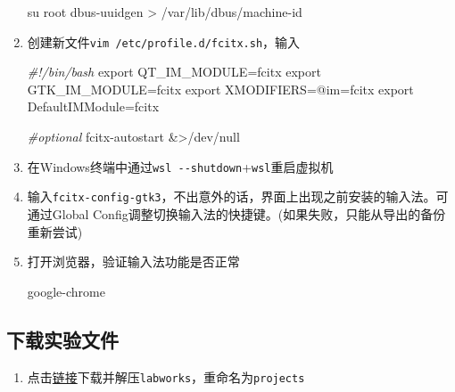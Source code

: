 \documentclass[
]{article}
\newenvironment{Shaded}{}{}
\newcommand{\BuiltInTok}[1]{\textcolor[rgb]{0.00,0.50,0.00}{#1}}
\newcommand{\CommentTok}[1]{\textcolor[rgb]{0.38,0.63,0.69}{\textit{#1}}}
\newcommand{\ExtensionTok}[1]{#1}
\newcommand{\FunctionTok}[1]{\textcolor[rgb]{0.02,0.16,0.49}{#1}}
\newcommand{\NormalTok}[1]{#1}
\newcommand{\OperatorTok}[1]{\textcolor[rgb]{0.40,0.40,0.40}{#1}}
\newcommand{\VariableTok}[1]{\textcolor[rgb]{0.10,0.09,0.49}{#1}}
\begin{document}
\begin{enumerate}
	      \begin{Shaded}
		      \begin{Highlighting}[]
			      \FunctionTok{su}\NormalTok{ root}
			      \ExtensionTok{dbus{-}uuidgen} \OperatorTok{\textgreater{}}\NormalTok{ /var/lib/dbus/machine{-}id}
		      \end{Highlighting}
	      \end{Shaded}
	\item
	      创建新文件\texttt{vim\ /etc/profile.d/fcitx.sh}，输入

	      \begin{Shaded}
		      \begin{Highlighting}[]
			      \CommentTok{\#!/bin/bash}
			      \BuiltInTok{export} \VariableTok{QT\_IM\_MODULE}\OperatorTok{=}\NormalTok{fcitx}
			      \BuiltInTok{export} \VariableTok{GTK\_IM\_MODULE}\OperatorTok{=}\NormalTok{fcitx}
			      \BuiltInTok{export} \VariableTok{XMODIFIERS}\OperatorTok{=}\NormalTok{@im=fcitx}
			      \BuiltInTok{export} \VariableTok{DefaultIMModule}\OperatorTok{=}\NormalTok{fcitx}

			      \CommentTok{\#optional}
			      \ExtensionTok{fcitx{-}autostart} \OperatorTok{\&\textgreater{}}\NormalTok{/dev/null}
		      \end{Highlighting}
	      \end{Shaded}
	\item
	      在Windows终端中通过\texttt{wsl\ -\/-shutdown}+\texttt{wsl}重启虚拟机
	\item
	      输入\texttt{fcitx-config-gtk3}，不出意外的话，界面上出现之前安装的输入法。可通过Global
	      Config调整切换输入法的快捷键。(如果失败，只能从导出的备份重新尝试)
	\item
	      打开浏览器，验证输入法功能是否正常

	      \begin{Shaded}
		      \begin{Highlighting}[]
			      \NormalTok{google{-}chrome}
		      \end{Highlighting}
	      \end{Shaded}
\end{enumerate}

\subsection{下载实验文件}\label{ux4e0bux8f7dux5b9eux9a8cux6587ux4ef6}

\begin{enumerate}
	\def\labelenumi{\arabic{enumi}.}
	\item
	      点击\href{https://seunic-my.sharepoint.cn/personal/101011912_seu_edu_cn/_layouts/15/onedrive.aspx?id=/personal/101011912_seu_edu_cn/Documents/教学/Teaching/操作系统/OSC_labs/Xv6.labworks.7z&parent=/personal/101011912_seu_edu_cn/Documents/教学/Teaching/操作系统/OSC_labs}{链接}下载并解压\texttt{labworks}，重命名为\texttt{projects}
\end{enumerate}
\end{document}
